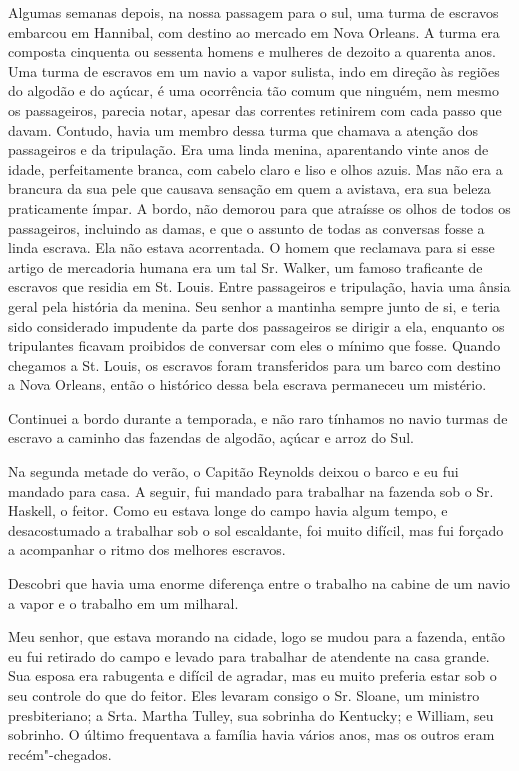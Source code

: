 Algumas semanas depois, na nossa passagem para o sul, uma turma de
escravos embarcou em Hannibal, com destino ao mercado em Nova Orleans. A
turma era composta cinquenta ou sessenta homens e mulheres de dezoito a
quarenta anos. Uma turma de escravos em um navio a vapor sulista, indo
em direção às regiões do algodão e do açúcar, é uma ocorrência tão comum
que ninguém, nem mesmo os passageiros, parecia notar, apesar das
correntes retinirem com cada passo que davam. Contudo, havia um membro
dessa turma que chamava a atenção dos passageiros e da tripulação. Era
uma linda menina, aparentando vinte anos de idade, perfeitamente branca,
com cabelo claro e liso e olhos azuis. Mas não era a brancura da sua
pele que causava sensação em quem a avistava, era sua beleza
praticamente ímpar. A bordo, não demorou para que atraísse os olhos de
todos os passageiros, incluindo as damas, e que o assunto de todas as
conversas fosse a linda escrava. Ela não estava acorrentada. O homem que
reclamava para si esse artigo de mercadoria humana era um tal Sr.
Walker, um famoso traficante de escravos que residia em St. Louis. Entre
passageiros e tripulação, havia uma ânsia geral pela história da menina.
Seu senhor a mantinha sempre junto de si, e teria sido considerado
impudente da parte dos passageiros se dirigir a ela, enquanto os
tripulantes ficavam proibidos de conversar com eles o mínimo que fosse.
Quando chegamos a St. Louis, os escravos foram transferidos para um
barco com destino a Nova Orleans, então o histórico dessa bela escrava
permaneceu um mistério.

Continuei a bordo durante a temporada, e não raro tínhamos no navio
turmas de escravo a caminho das fazendas de algodão, açúcar e arroz do
Sul.

Na segunda metade do verão, o Capitão Reynolds deixou o barco e eu fui
mandado para casa. A seguir, fui mandado para trabalhar na fazenda sob o
Sr. Haskell, o feitor. Como eu estava longe do campo havia algum tempo,
e desacostumado a trabalhar sob o sol escaldante, foi muito difícil, mas
fui forçado a acompanhar o ritmo dos melhores escravos.

Descobri que havia uma enorme diferença entre o trabalho na cabine de um
navio a vapor e o trabalho em um milharal.

Meu senhor, que estava morando na cidade, logo se mudou para a fazenda,
então eu fui retirado do campo e levado para trabalhar de atendente na
casa grande. Sua esposa era rabugenta e difícil de agradar, mas eu muito
preferia estar sob o seu controle do que do feitor. Eles levaram consigo
o Sr. Sloane, um ministro presbiteriano; a Srta. Martha Tulley, sua
sobrinha do Kentucky; e William, seu sobrinho. O último frequentava a
família havia vários anos, mas os outros eram recém"-chegados.

